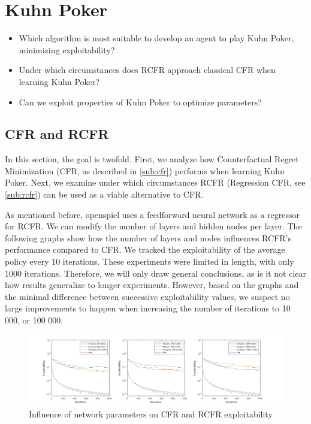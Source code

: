 \documentclass[10pt,a4paper]{article}
\begin{document}
\section{Kuhn Poker}
\begin{tcolorbox}
\begin{itemize}
\item{Which algorithm is most suitable to develop an agent to play Kuhn Poker, minimizing exploitability?}
\item{Under which circumstances does RCFR approach classical CFR when learning Kuhn Poker?}
\item{Can we exploit properties of Kuhn Poker to optimize parameters?}
\end{itemize}
\end{tcolorbox}

\subsection{CFR and RCFR}
In this section, the goal is twofold. First, we analyze how Counterfactual Regret Minimization (CFR, as described in \ref{sub:cfr}) performs when learning Kuhn Poker. Next, we examine under which circumstances RCFR (Regression CFR, see \ref{sub:rcfr}) can be used as a viable alternative to CFR.

As mentioned before, openspiel uses a feedforward neural network as a regressor for RCFR. We can modify the number of layers and hidden nodes per layer. The following graphs show how the number of layers and nodes influences RCFR's performance compared to CFR. We tracked the exploitability of the average policy every 10 iterations. These experiments were limited in length, with only 1000 iterations. Therefore, we will only draw general conclusions, as is it not clear how results generalize to longer experiments. However, based on the graphs and the minimal difference between successive exploitability values, we suspect no large improvements to happen when increasing the number of iterations to 10 000, or 100 000.


\FloatBarrier
\begin{figure}[h]
\includegraphics[scale=0.4]{Figures/rcfr_kuhn_parameters.png}
\caption{Influence of network parameters on CFR and RCFR exploitability}
\label{fig:rcfr_kuhn}
\end{figure}
\FloatBarrier 
\end{document}

